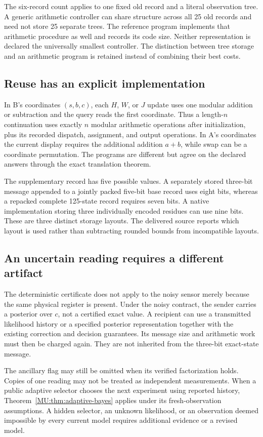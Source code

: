 The six-record count applies to one fixed old record and a literal observation tree. A generic arithmetic controller can share structure across all 25 old records and need not store 25 separate trees. The reference program implements that arithmetic procedure as well and records its code size. Neither representation is declared the universally smallest controller. The distinction between tree storage and an arithmetic program is retained instead of combining their best costs.

\subsection{Reuse has an explicit implementation}
In B's coordinates $(s,b,c)$, each $H$, $W$, or $J$ update uses one modular addition or subtraction and the query reads the first coordinate. Thus a length-$n$ continuation uses exactly $n$ modular arithmetic operations after initialization, plus its recorded dispatch, assignment, and output operations. In A's coordinates the current display requires the additional addition $a+b$, while swap can be a coordinate permutation. The programs are different but agree on the declared answers through the exact translation theorem.

The supplementary record has five possible values. A separately stored three-bit message appended to a jointly packed five-bit base record uses eight bits, whereas a repacked complete 125-state record requires seven bits. A native implementation storing three individually encoded residues can use nine bits. These are three distinct storage layouts. The delivered source reports which layout is used rather than subtracting rounded bounds from incompatible layouts.

\subsection{An uncertain reading requires a different artifact}
The deterministic certificate does not apply to the noisy sensor merely because the same physical register is present. Under the noisy contract, the sender carries a posterior over $c$, not a certified exact value. A recipient can use a transmitted likelihood history or a specified posterior representation together with the existing correction and decision guarantees. Its message size and arithmetic work must then be charged again. They are not inherited from the three-bit exact-state message.

The ancillary flag may still be omitted when its verified factorization holds. Copies of one reading may not be treated as independent measurements. When a public adaptive selector chooses the next experiment using reported history, Theorem~\ref{MU:thm:adaptive-bayes} applies under its fresh-observation assumptions. A hidden selector, an unknown likelihood, or an observation deemed impossible by every current model requires additional evidence or a revised model.

